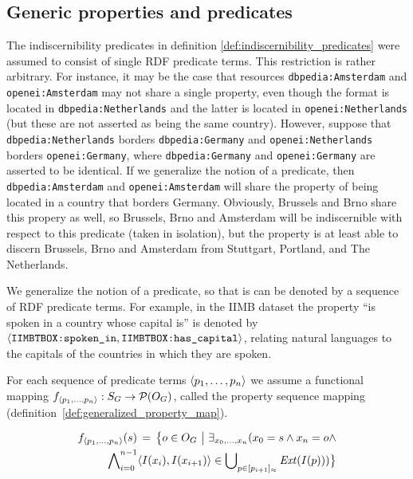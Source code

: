 \subsection{Generic properties and predicates}
\label{sec:generic_properties}

The indiscernibility predicates in
  definition \ref{def:indiscernibility_predicates}
  were assumed to consist of single RDF predicate terms.
This restriction is rather arbitrary.
For instance,
  it may be the case that resources {\small \texttt{dbpedia:Amsterdam}}
  and {\small \texttt{openei:Amsterdam}} may not share a single property,
  even though the format is located in {\small \texttt{dbpedia:Netherlands}}
  and the latter is located in {\small \texttt{openei:Netherlands}}
  (but these are not asserted as being the same country).
However, suppose that {\small \texttt{dbpedia:Netherlands}}
  borders {\small \texttt{dbpedia:Germany}}
  and {\small \texttt{openei:Netherlands}}
  borders {\small \texttt{openei:Germany}},
  where {\small \texttt{dbpedia:Germany}} and
  {\small \texttt{openei:Germany}} are asserted to be identical.
If we generalize the notion of a predicate,
  then {\small \texttt{dbpedia:Amsterdam}} and
  {\small \texttt{openei:Amsterdam}} will share the property
  of being located in a country that borders Germany.
Obviously, Brussels and Brno share this propery as well,
  so Brussels, Brno and Amsterdam will be indiscernible with respect to
  this predicate (taken in isolation), but the property is at least
  able to discern Brussels, Brno and Amsterdam from
  Stuttgart, Portland, and The Netherlands.

We generalize the notion of a predicate,
  so that is can be denoted by a sequence of RDF predicate terms.
For example, in the IIMB dataset the property
  ``is spoken in a country whose capital is'' is denoted by
  {\small $\langle\texttt{IIMBTBOX:spoken\_in},\texttt{IIMBTBOX:has\_capital}\rangle$},
  relating natural languages to the capitals of the countries in which
  they are spoken.

For each sequence of predicate terms $\langle p_1,\ldots,p_n\rangle$
  we assume a functional mapping
  $f_{\langle p_1,\ldots,p_n\rangle} : S_G \rightarrow \mathcal{P}(O_G)$,
  called the property sequence mapping
  \mbox{(definition \ref{def:generalized_property_map})}.

\begin{definition}
\label{def:generalized_property_map}
\begin{align}
  f_{\langle p_1,\ldots,p_n\rangle}(s)
\,=\,
  \big\{o \in O_G\,\,\big\vert\,\,
    \exists_{x_0,\ldots,x_n}(
      x_0 = s \land x_n = o \land\nonumber\\
      \bigwedge_{i=0}^{n-1}\nolimits
          \langle I(x_i),I(x_{i+1})\rangle
        \in
          \bigcup_{p \in [p_{i+1}]_{\approx}}\nolimits \mathit{Ext}(I(p))
    )
  \big\}\nonumber
\end{align}
\end{definition}

